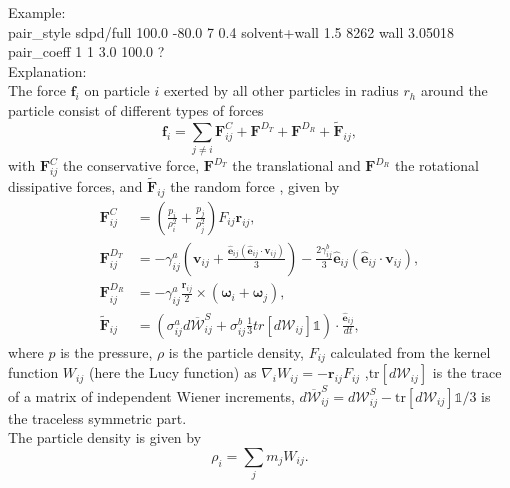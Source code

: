 \documentclass[a4paper,10pt]{scrreprt}
\begin{document}
Example:
\\[0.5ex]
pair\_style      sdpd/full 100.0 -80.0 7 0.4 solvent+wall 1.5 8262 wall 3.05018
\\[1ex]
pair\_coeff      1 1 3.0 100.0 ?
\\[2ex]
Explanation:\\
The force $\mathbf{f}_i$ on particle $i$ exerted by all other particles in radius $r_h$ around the particle 
consist of different types of forces
\begin{equation}
\mathbf{f}_i = \sum_{j \neq i} \mathbf{F}^C_{ij} +\mathbf{F}^{D_T} + \mathbf{F}^{D_R} + \mathbf{ \tilde F}_{ij},
\end{equation}
with  $\mathbf{F}^C_{ij}$ the conservative force, $\mathbf{F}^{D_T}$ the translational and $\mathbf{F}^{D_R}$ the rotational dissipative forces, and $\mathbf{ \tilde F}_{ij}$ the random force , given by
%
\begin{align}\label{eq:sdpd_forces}
\mathbf{F}^C_{ij} &= \left( \frac{p_i}{\rho_i^2} + \frac{p_j}{\rho_j^2} \right) F_{ij} \mathbf{r}_{ij}, \nonumber \\
\mathbf{F}^{D_T}_{ij} &= -  \gamma_{ij}^a \left(  \mathbf{v}_{ij} + \frac{ \hat{\mathbf{e}}_{ij}  \left( \hat{\mathbf{e}}_{ij} \cdot \mathbf{v}_{ij} \right) }{3} \right)   - \frac{ 2 \gamma_{ij}^b }{3} \hat{\mathbf{e}}_{ij} \left( \hat{\mathbf{e}}_{ij} 
 \cdot \mathbf{v}_{ij} \right),  \\ 
\mathbf{F}^{D_R}_{ij} & = - \gamma_{ij}^a\frac{\mathbf{ r}_{ij}}{2}\times \left( {\boldsymbol {\omega}}_i+{\boldsymbol{\omega}}_j \right), \nonumber \\ 
\mathbf{ \tilde F}_{ij} &=  \left(  \sigma_{ij}^{a} d\overline{\boldsymbol{\mathcal{W}}}_{ij}^S + \sigma_{ij}^{b} 
\frac{1}{3}tr[d\boldsymbol{\mathcal{W}}_{ij}] \mathds{1} \right) \cdot \frac{\mathbf{\hat e}_{ij}}{dt}, \nonumber
\end{align}
where $p$ is the pressure, $\rho$ is the particle density, $F_{ij}$ calculated from the kernel function $W_{ij}$ (here the Lucy function) as $\nabla_i W_{ij} = -{\mathbf r}_{ij}F_{ij}$  ,$\text{tr}[d\boldsymbol{\mathcal{ W}}_{ij}]$ is the trace of a matrix of independent Wiener increments, 
$d \overline{\boldsymbol{\mathcal{W}}}^{S}_{ij} = d \boldsymbol{\mathcal{W}}^S_{ij} - \text{tr}[d\boldsymbol{\mathcal{W}}_{ij}]\mathds{1}/3$ is the traceless symmetric part.\\
The particle density is given by
%
\begin{equation}\label{eq:rho}
	\rho_i = \sum_j m_j W_{ij}. 
\end{equation}
\end{document}

